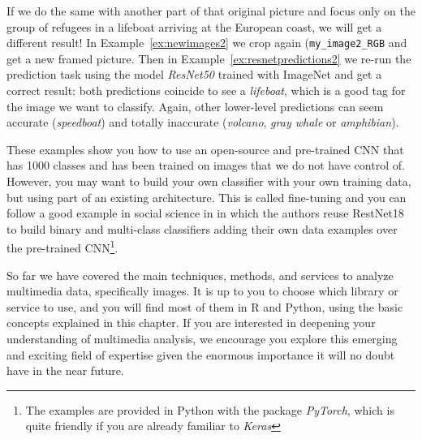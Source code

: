If we do the same with another part of that original picture and focus only on the  group of refugees in a lifeboat  arriving at the European coast, we will get a different result! In Example~\ref{ex:newimages2} we crop again (\texttt{my\_image2\_RGB} and get a new framed picture. Then in Example~\ref{ex:resnetpredictions2} we re-run the prediction task using the model \textit{ResNet50} trained with ImageNet and get a correct result: both predictions coincide to see a \textit{lifeboat}, which is a good tag for the image we want to classify. Again, other lower-level predictions can seem accurate (\textit{speedboat}) and totally inaccurate (\textit{volcano}, \textit{gray whale} or \textit{amphibian}).



These examples show you how to use an open-source and pre-trained CNN that has 1000 classes and has been trained on images that we do not have control of. However, you may want to build your own classifier with your own training data, but using part of an existing architecture. This is called fine-tuning and you can follow a good example in social science in \citet{williams2020images} in which the authors reuse RestNet18 to build binary and multi-class classifiers adding their own data examples over the pre-trained CNN\footnote{The examples are provided in Python with the package \emph{PyTorch}, which is quite friendly if you are already familiar to \emph{Keras} }.

So far we have covered the main techniques, methods, and services to analyze multimedia data, specifically images. It is up to you to choose which library or service to use, and you will find most of them in R and Python, using the basic concepts explained in this chapter. If you are interested in deepening your understanding of multimedia analysis, we encourage you explore this emerging and exciting field of expertise given the enormous importance it will no doubt have in the near future.


